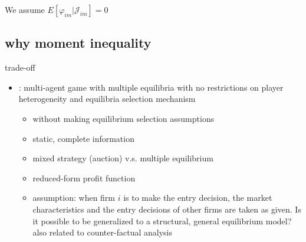 \documentclass[a4paper]{article}
\begin{document}
We assume $E[\varphi_{im}|\mathcal{J}_{im}] = 0$

\subsection*{why moment inequality}

trade-off

\begin{itemize}
\item \cite{ciliberto2009market}: multi-agent game with multiple equilibria with no restrictions on player heterogeneity and equilibria selection mechanism
\begin{itemize}
\item without making equilibrium selection assumptions
\item static, complete information
\item mixed strategy (auction) v.s. multiple equilibrium 
\item reduced-form profit function
\item assumption: when firm $i$ is to make the entry decision, the market characteristics and the entry decisions of other firms are taken as given. Is it possible to be generalized to a structural, general equilibrium model? also related to counter-factual analysis
\end{itemize}

\end{itemize}



\end{document}
